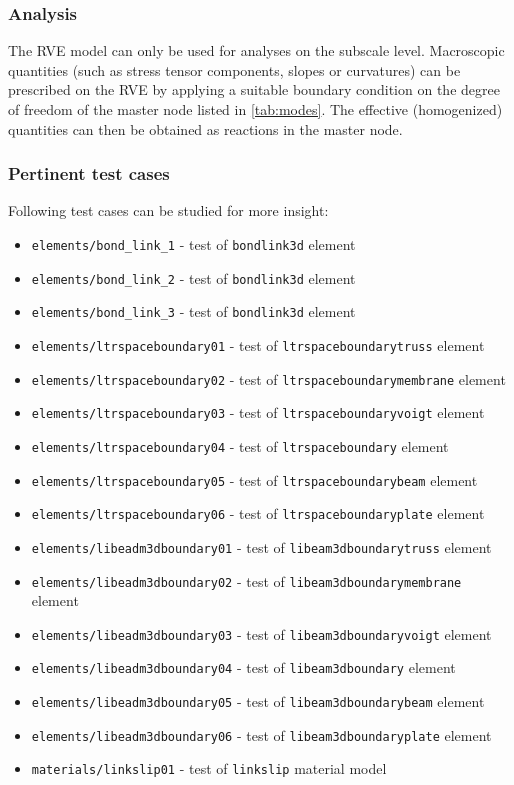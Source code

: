 \documentclass[11pt]{article}
\newcommand{\param}[1]{\texttt{#1}}
\begin{document}
\subsubsection{Analysis}
The RVE model can only be used for analyses on the subscale level. Macroscopic quantities (such as stress tensor components, slopes or curvatures) can be prescribed on the RVE by applying a suitable boundary condition on the degree of freedom of the master node listed in \cref{tab:modes}. 
The effective (homogenized) quantities can then be obtained as reactions in the master node.


\subsubsection{Pertinent test cases}

Following test cases can be studied for more insight: 
\begin{itemize}
    \item \texttt{elements/bond\_link\_1} - test of \param{bondlink3d} element
    \item \texttt{elements/bond\_link\_2} - test of \param{bondlink3d} element
    \item \texttt{elements/bond\_link\_3} - test of \param{bondlink3d} element
    \item \texttt{elements/ltrspaceboundary01} - test of \param{ltrspaceboundarytruss} element
    \item \texttt{elements/ltrspaceboundary02} - test of \param{ltrspaceboundarymembrane} element
    \item \texttt{elements/ltrspaceboundary03} - test of \param{ltrspaceboundaryvoigt} element
    \item \texttt{elements/ltrspaceboundary04} - test of \param{ltrspaceboundary} element
    \item \texttt{elements/ltrspaceboundary05} - test of \param{ltrspaceboundarybeam} element
    \item \texttt{elements/ltrspaceboundary06} - test of \param{ltrspaceboundaryplate} element
    \item \texttt{elements/libeadm3dboundary01} - test of \param{libeam3dboundarytruss} element
    \item \texttt{elements/libeadm3dboundary02} - test of \param{libeam3dboundarymembrane} element
    \item \texttt{elements/libeadm3dboundary03} - test of \param{libeam3dboundaryvoigt} element
    \item \texttt{elements/libeadm3dboundary04} - test of \param{libeam3dboundary} element
    \item \texttt{elements/libeadm3dboundary05} - test of \param{libeam3dboundarybeam} element
    \item \texttt{elements/libeadm3dboundary06} - test of \param{libeam3dboundaryplate} element
    \item \texttt{materials/linkslip01} - test of \param{linkslip} material model
\end{itemize}
\end{document}

